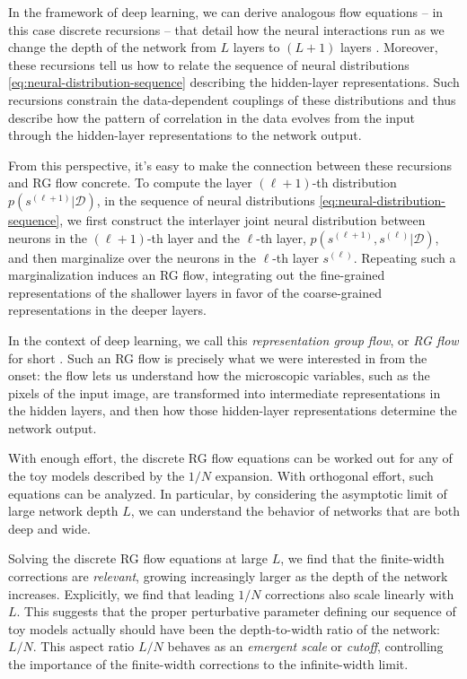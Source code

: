 \documentclass[12pt]{article}
\begin{document}
In the framework of deep learning, we can derive analogous flow equations -- in this case discrete recursions -- that detail how the neural interactions run as we change the depth of the network from $L$ layers to $(L+1)$ layers \cite{Yaida2019}. Moreover, these recursions tell us how to relate the sequence of neural distributions \eqref{eq:neural-distribution-sequence} describing the hidden-layer representations. Such recursions constrain the data-dependent couplings of these distributions and thus describe how the pattern of correlation in the data evolves from the input through the hidden-layer representations to the network output.

From this perspective, it's easy to make the connection between these recursions and RG flow concrete. To compute the layer $(\ell+1)$-th distribution $p(s^{(\ell+1)}|\mathcal{D})$, in the sequence of neural distributions \eqref{eq:neural-distribution-sequence}, we first construct the interlayer joint neural distribution between neurons in the $(\ell+1)$-th layer and the $\ell$-th layer,  
$p(s^{(\ell+1)}, s^{(\ell)}|\mathcal{D})$, and then marginalize over the neurons in the $\ell$-th layer $s^{(\ell)}$. Repeating such a marginalization induces an RG flow, integrating out the fine-grained representations of the shallower layers in favor of the coarse-grained representations in the deeper layers. 

In the context of deep learning, we call this \emph{representation group flow}, or \emph{RG flow} for short \cite{Principles}. Such an RG flow is precisely what we were interested in from the onset: the flow lets us understand how the microscopic variables, such as the pixels of the input image, are transformed into intermediate representations in the hidden layers, and then how those hidden-layer representations determine the network output.

With enough effort, the discrete RG flow equations can be worked out for any of the toy models described by the $1/N$ expansion. With orthogonal effort, such equations can be analyzed. In particular, by considering the asymptotic limit of large network depth $L$, we can understand the behavior of networks that are both deep and wide.








Solving the discrete RG flow equations at large $L$, we find that the finite-width corrections are \emph{relevant}, growing increasingly larger as the depth of the network increases. Explicitly, we find that leading $1/N$ corrections also scale linearly with $L$. This suggests that the proper perturbative parameter defining our sequence of toy models actually should have been the depth-to-width ratio of the network: $L/N$. This aspect ratio $L/N$ behaves as an \emph{emergent scale} or \emph{cutoff}, controlling the importance of the finite-width corrections to the infinite-width limit.
\end{document}
